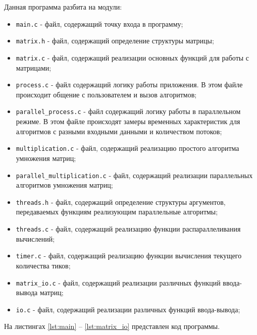 Данная программа разбита на модули:
\begin{itemize}
    \item \texttt{main.c} - файл, содержащий точку входа в программу;
    \item \texttt{matrix.h} - файл, содержащий определение структуры матрицы;
    \item \texttt{matrix.c} - файл, содержащий реализации основных функций для работы с матрицами;
    \item \texttt{process.c} - файл содержащий логику работы приложения. В этом файле происходит общение с пользователем и вызов алгоритмов;
    \item \texttt{parallel\_process.c} - файл содержащий логику работы в параллельном режиме. В этом файле происходят замеры временных характеристик для алгоритмов с разными входными данными и количеством потоков;
    \item \texttt{multiplication.c} - файл, содержащий реализацию простого алгоритма умножения матриц;
    \item \texttt{parallel\_multiplication.c} - файл, содержащий реализации параллельных алгоритмов умножения матриц;
    \item \texttt{threads.h} - файл, содержащий определение структуры аргументов, передаваемых функциям реализующим параллельные алгоритмы;
    \item \texttt{threads.c} - файл, содержащий реализацию функции распараллеливания вычислений;
    \item \texttt{timer.c} - файл, содержащий реализацию функции вычисления текущего количества тиков;
    \item \texttt{matrix\_io.c} - файл, содержащий реализации различных функций ввода-вывода матриц;
    \item \texttt{io.c} - файл, содержащий реализации различных функций ввода-вывода;
\end{itemize}

На листингах \ref{lst:main} -- \ref{lst:matrix_io} представлен код программы.



\clearpage


\clearpage

